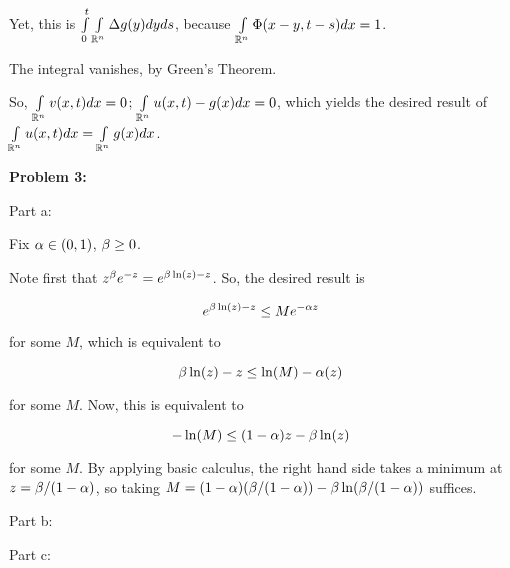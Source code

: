 \documentclass[a4paper,12pt]{article}
\begin{document}
Yet, this is $ \int\limits_0^t \int\limits_{\mathbb{R}^n} \Delta g(y) dy ds$, because $\int\limits_{\mathbb{R}^n} \Phi(x-y,t-s) dx = 1$. 

The integral vanishes, by Green's Theorem. %

So, $\int\limits_{\mathbb{R}^n} v(x,t) dx = 0$; $\int\limits_{\mathbb{R}^n} u(x,t) - g(x) dx = 0$, which yields the desired result of $\int\limits_{\mathbb{R}^n} u(x,t) dx = \int\limits_{\mathbb{R}^n} g(x) dx$.

\shunt

{\bf Problem 3:}

Part a: %

Fix $\alpha \in (0,1)$, $\beta \geq 0$.

Note first that $z^\beta e^{-z} = e^{\beta \ln(z) - z}$. So, the desired result is

\begin{displaymath}
e^{\beta \ln(z) - z} \leq M e^{-\alpha z}
\end{displaymath}

for some $M$, which is equivalent to

\begin{displaymath}
\beta \ln(z) - z \leq \ln(M) - \alpha(z)
\end{displaymath}

for some $M$. Now, this is equivalent to 

\begin{displaymath}
- \ln(M) \leq (1-\alpha)z - \beta \ln(z)
\end{displaymath}

for some $M$. By applying basic calculus, the right hand side takes a minimum at $z = \beta / (1-\alpha)$, so taking $M = (1-\alpha)(\beta / (1-\alpha)) - \beta \ln(\beta / (1-\alpha))$ suffices. 

\shunt

Part b:

\shunt

Part c:

\shunt
\end{document}
